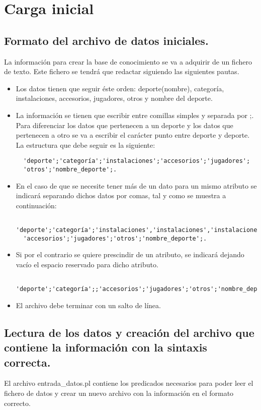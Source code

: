 \chapter{Carga inicial}

\section{Formato del archivo de datos iniciales.}
\label{sec:formato}

La información para crear la base de conocimiento se va a adquirir de un fichero de texto. Este fichero se tendrá que redactar siguiendo las siguientes pautas.
\begin{itemize}
 \item Los datos tienen que seguir éste orden: deporte(nombre), categoría, instalaciones, accesorios, jugadores, otros y nombre del deporte.
 \item La información se tienen que escribir entre comillas simples y separada por ;. Para diferenciar los datos que pertenecen a un deporte y los datos que pertenecen a otro se va a escribir el carácter punto entre deporte y deporte. La estructura que debe seguir es la siguiente:

\begin{verbatim}
  'deporte';'categoría';'instalaciones';'accesorios';'jugadores';
  'otros';'nombre_deporte';.
\end{verbatim}

 \item En el caso de que se necesite tener más de un dato para un mismo atributo se indicará separando dichos datos por comas, tal y como se muestra a continuación:
\begin{verbatim}
  'deporte';'categoría';'instalaciones','instalaciones','instalaciones';
  'accesorios';'jugadores';'otros';'nombre_deporte';.
\end{verbatim}
 
\item Si por el contrario se quiere prescindir de un atributo, se indicará dejando vacío el espacio reservado para dicho atributo.
\begin{verbatim}
 'deporte';'categoría';;'accesorios';'jugadores';'otros';'nombre_deporte';.
\end{verbatim}

 \item El archivo debe terminar con un salto de línea.
\end{itemize}

\section{Lectura de los datos y creación del archivo que contiene la información con la sintaxis correcta.}
El archivo entrada\_datos.pl contiene los predicados necesarios para poder leer el fichero de datos y crear un nuevo archivo con la información en el formato correcto.\\ 

